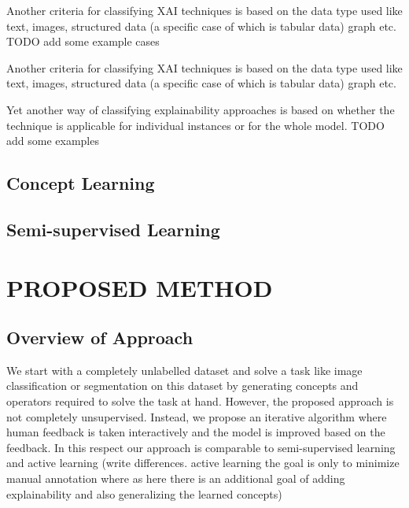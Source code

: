 \documentclass{JMLFS}
\begin{document}
Another criteria for classifying XAI techniques is based on the data type used like text, images, structured data (a specific case of which is tabular data) graph etc.
TODO add some example cases

Another criteria for classifying XAI techniques is based on the data type used like text, images, structured data (a specific case of which is tabular data) graph etc.

Yet another way of classifying explainability approaches is based on whether the technique is applicable for individual instances or for the whole model.
TODO add some examples

\subsection{Concept Learning}
\subsection{Semi-supervised Learning}

\section{{ PROPOSED METHOD}}\label{proposed_method}

\subsection{Overview of Approach}
We start with a completely unlabelled dataset and solve a task like image classification or segmentation on this dataset by generating concepts and operators required to solve the task at hand.
However, the proposed approach is not completely unsupervised.
Instead, we propose an iterative algorithm where human feedback is taken interactively and the model is improved based on the feedback.
In this respect our approach is comparable to semi-supervised learning and active learning (write differences. active learning the goal is only to minimize manual annotation where as here there is an additional goal of adding explainability and also generalizing the learned concepts)
\end{document}
